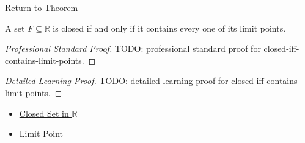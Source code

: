 \newpage
{}
\label{prf:closed-iff-contains-limit-points}

\begin{remark*}[Return]
\hyperref[thm:closed-iff-contains-limit-points]{Return to Theorem}
\end{remark*}

\begin{theorem*}
A set $F\subseteq\mathbb{R}$ is closed if and only if it contains every one of its limit points.
\end{theorem*}

\begin{proof}[Professional Standard Proof]
\LRAProofBodyStart
TODO: professional standard proof for closed-iff-contains-limit-points.
\end{proof}

\begin{proof}[Detailed Learning Proof]
\LRAProofBodyStart
TODO: detailed learning proof for closed-iff-contains-limit-points.
\end{proof}

\begin{remark*}
\end{remark*}

\begin{dependencies}
\begin{itemize}
  \item \hyperref[def:closed-set]{Closed Set in $\mathbb{R}$}
  \item \hyperref[def:limit-point]{Limit Point}
\end{itemize}
\end{dependencies}

\clearpage
